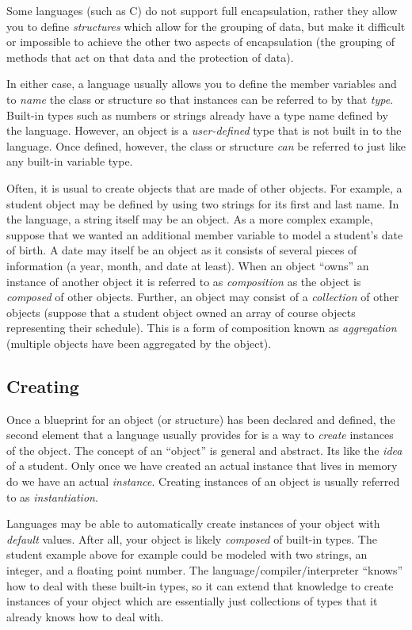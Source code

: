 Some languages (such as C) do not support full encapsulation, rather they
allow you to define \emph{structures} which allow for the grouping of data, 
but make it difficult or impossible to achieve the other two aspects of
encapsulation (the grouping of methods that act on that data and the
protection of data).

In either case, a language usually allows you to define the member variables
and to \emph{name} the class or structure so that instances can be referred
to by that \emph{type}.  Built-in types such as numbers or strings already
have a type name defined by the language.  However, an object is a 
\emph{user-defined} type that is not built in to the language.  Once defined,
however, the class or structure \emph{can} be referred to just like any
built-in variable type.

Often, it is usual to create objects that are made of other objects.  For
example, a student object may be defined by using two strings for its first
and last name.  In the language, a string itself may be an object.  As a
more complex example, suppose that we wanted an additional member variable
to model a student's date of birth.  A date may itself be an object as it
consists of several pieces of information (a year, month, and date at least).
When an object ``owns'' an instance of another object it is referred to
as \emph{composition}  as the object is \emph{composed} of 
other objects.  Further, an object may consist of a \emph{collection}
of other objects (suppose that a student object owned an array of 
course objects representing their schedule).  This is a form of composition
known as \emph{aggregation} (multiple objects have been aggregated
by the object).

\subsection{Creating}

Once a blueprint for an object (or structure) has been declared and defined, 
the second element that a language usually provides for is a way to 
\emph{create} instances of the object.  The concept of an ``object'' is
general and abstract.  Its like the \emph{idea} of a student.  Only once
we have created an actual instance that lives in memory do we have an 
actual \emph{instance}.  Creating instances of an object is usually
referred to as \emph{instantiation}.  

Languages may be able to automatically create instances of your object
with \emph{default} values.  After all, your object is likely 
\emph{composed} of built-in types.  The student example above for
example could be modeled with two strings, an integer, and a floating
point number.  The language/compiler/interpreter ``knows'' how to deal
with these built-in types, so it can extend that knowledge to create
instances of your object which are essentially just collections of 
types that it already knows how to deal with.

